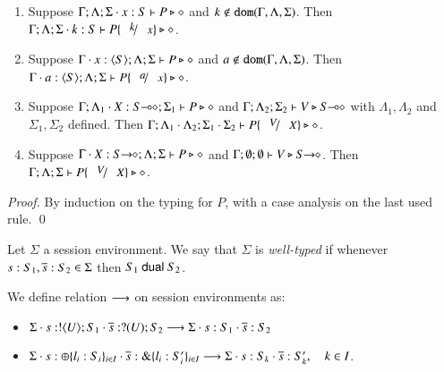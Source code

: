 \begin{lemma}\rm
	\begin{enumerate}[1.]
		\item	Suppose $\Gamma; \Lambda; \Sigma \cdot x:S  \vdash P \triangleright \diamond$ and
			$k \not\in \mathtt{dom}(\Gamma, \Lambda, \Sigma)$. 
			Then $\Gamma; \Lambda; \Sigma \cat k:S  \vdash P\subst{k}{x} \hastype \Proc$.

		\item	Suppose $\Gamma \cdot x:\langle S \rangle; \Lambda; \Sigma \vdash P \triangleright \diamond$ and
			$a \not\in \mathtt{dom}(\Gamma, \Lambda, \Sigma)$. 
			Then $\Gamma \cat a:\chtype{S}; \Lambda; \Sigma   \vdash P\subst{a}{x} \hastype \Proc$.

		\item	Suppose $\Gamma; \Lambda_1 \cdot X:S\!\! \multimap\!\! \diamond; \Sigma_1  \vdash P \triangleright \diamond$ 
			and $\Gamma; \Lambda_2; \Sigma_2  \vdash V \triangleright S\!\! \multimap\!\! \diamond$ with 
			$\Lambda_1, \Lambda_2$ and $\Sigma_1, \Sigma_2$ defined.  
			Then $\Gamma; \Lambda_1 \cat \Lambda_2; \Sigma_1 \cat \Sigma_2  \proves P\subst{V}{X} \hastype \Proc$.

		\item	Suppose $\Gamma \cdot X:S\!\! \rightarrow\!\! \diamond; \Lambda; \Sigma  \vdash P \triangleright \diamond$ and
			$\Gamma; \emptyset ; \emptyset  \vdash V \triangleright S\!\! \rightarrow\!\! \diamond$.
			Then $\Gamma; \Lambda; \Sigma  \proves P\subst{V}{X} \hastype \Proc$.
		\end{enumerate}
\end{lemma}

\begin{proof}
By induction on the typing for $P$, with a case analysis on the last used rule. 
\qed
\end{proof}

\begin{definition}\rm
	Let $\Sigma$ a session environment.
	We say that $\Sigma$ is {\em well-typed} if whenever
	$s: S_1, \overline{s}: S_2 \in \Sigma$ then $S_1 \ \mathsf{dual}\  S_2$.
\end{definition}

\begin{definition}\rm
	We define relation $\longrightarrow$ on session environments as:
	\begin{itemize}
		\item	$\Sigma \cdot s: ! \langle U \rangle ; S_1 \cdot \overline{s}: ? (U) ; S_2 \longrightarrow \Sigma \cdot s: S_1 \cdot \overline{s}: S_2$
		\item	$\Sigma \cdot s: \oplus \{l_i: S_i\}_{i \in I} \cdot \overline{s}: \& \{l_i: S_i'\}_{i \in I} \longrightarrow \Sigma \cdot s: S_k \cdot \overline{s}: S_k', \quad k \in I$.
	\end{itemize}
\end{definition}

